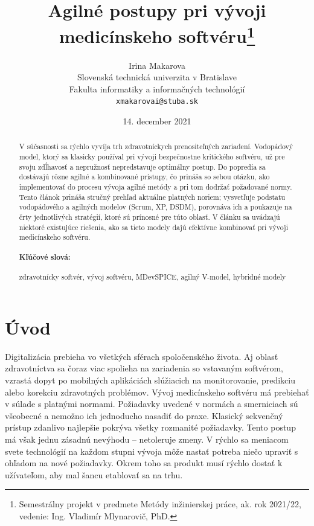 \documentclass[10pt,twoside,slovak,a4paper]{article}
\title{Agilné postupy pri vývoji medicínskeho softvéru\thanks{Semestrálny projekt v predmete Metódy inžinierskej práce, ak. rok 2021/22, vedenie: Ing. Vladimír Mlynarovič, PhD.}}
\author{Irina Makarova\\[2pt]
	{\small Slovenská technická univerzita v Bratislave}\\
	{\small Fakulta informatiky a informačných technológií}\\
	{\small \texttt{xmakarovai@stuba.sk}}
	}
\date{\small 14. december 2021}
\begin{document}
\maketitle

\begin{abstract}
V súčasnosti sa rýchlo vyvíja trh zdravotníckych prenositeľných zariadení. Vodopádový model, ktorý sa klasicky používal pri vývoji bezpečnostne kritického softvéru, už pre svoju zdĺhavosť a nepružnosť nepredstavuje optimálny postup. Do popredia sa dostávajú rôzne agilné a kombinované prístupy, čo prináša so sebou otázku, ako implementovať do procesu vývoja agilné metódy a pri tom dodržať požadované normy. Tento článok prináša stručný prehľad aktuálne platných noriem; vysvetľuje podstatu vodopádového a agilných modelov (Scrum, XP, DSDM), porovnáva ich a poukazuje na črty jednotlivých stratégií, ktoré sú prínosné pre túto oblasť. V článku sa uvádzajú niektoré existujúce riešenia, ako sa tieto modely dajú efektívne kombinovať pri vývoji medicínskeho softvéru.
\paragraph{Kľúčové slová:} zdravotnícky softvér, vývoj softvéru, MDevSPICE, agilný V-model, hybridné modely
\end{abstract}

\section{Úvod} 
Digitalizácia prebieha vo všetkých sférach spoločenského života. Aj oblasť zdravotníctva sa čoraz viac spolieha na zariadenia so vstavaným softvérom, vzrastá dopyt po mobilných aplikáciách slúžiacich na monitorovanie, predikciu alebo korekciu zdravotných problémov. Vývoj medicínskeho softvéru má prebiehať v súlade s platnými normami. Požiadavky uvedené v normách a smerniciach sú všeobecné a nemožno ich jednoducho nasadiť do praxe. Klasický sekvenčný prístup zdanlivo najlepšie pokrýva všetky rozmanité požiadavky. Tento postup má však jednu zásadnú nevýhodu – netoleruje zmeny. V rýchlo sa meniacom svete technológií na každom stupni vývoja môže nastať potreba niečo upraviť s ohľadom na nové požiadavky. Okrem toho sa produkt musí rýchlo dostať k užívateľom, aby mal šancu etablovať sa na trhu\cite{mchugh2013}. 
\end{document}
